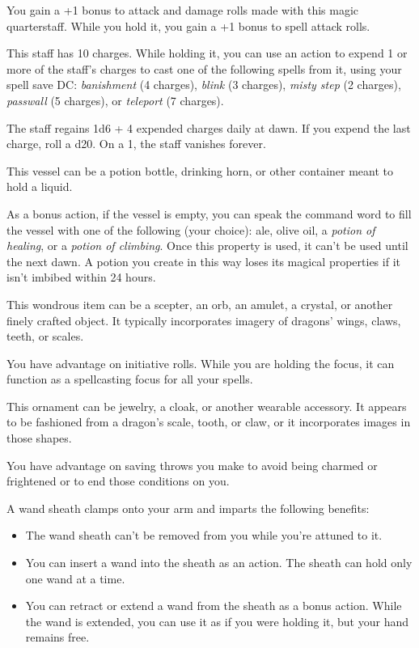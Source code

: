 \documentclass[10pt,a4paper,twoside,bg=print,twocolumn,openany,nodeprecatedcode]{dndbook}
\begin{document}
You gain a +1 bonus to attack and damage rolls made with this magic quarterstaff. While you hold it, you gain a +1 bonus to spell attack rolls.

This staff has 10 charges. While holding it, you can use an action to expend 1 or more of the staff's charges to cast one of the following spells from it, using your spell save DC: \textit{banishment} (4 charges), \textit{blink} (3 charges), \textit{misty step} (2 charges), \textit{passwall} (5 charges), or \textit{teleport} (7 charges).

The staff regains 1d6 + 4 expended charges daily at dawn. If you expend the last charge, roll a d20. On a 1, the staff vanishes forever.

This vessel can be a potion bottle, drinking horn, or other container meant to hold a liquid.

As a bonus action, if the vessel is empty, you can speak the command word to fill the vessel with one of the following (your choice): ale, olive oil, a \textit{potion of healing}, or a \textit{potion of climbing}. Once this property is used, it can't be used until the next dawn. A potion you create in this way loses its magical properties if it isn't imbibed within 24 hours.

This wondrous item can be a scepter, an orb, an amulet, a crystal, or another finely crafted object. It typically incorporates imagery of dragons' wings, claws, teeth, or scales.

You have advantage on initiative rolls. While you are holding the focus, it can function as a spellcasting focus for all your spells.

This ornament can be jewelry, a cloak, or another wearable accessory. It appears to be fashioned from a dragon's scale, tooth, or claw, or it incorporates images in those shapes.

You have advantage on saving throws you make to avoid being charmed or frightened or to end those conditions on you.

A wand sheath clamps onto your arm and imparts the following benefits:


\begin{itemize}
\item The wand sheath can't be removed from you while you're attuned to it.
\item You can insert a wand into the sheath as an action. The sheath can hold only one wand at a time.
\item You can retract or extend a wand from the sheath as a bonus action. While the wand is extended, you can use it as if you were holding it, but your hand remains free.
\end{itemize}
\end{document}
